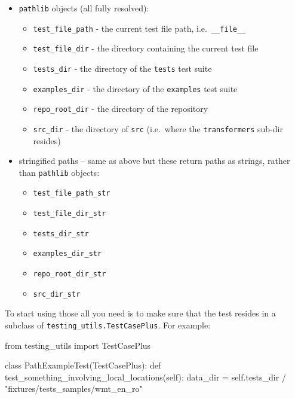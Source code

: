 \documentclass[
]{report}
\newenvironment{Shaded}{\begin{snugshade}}{\end{snugshade}}
\newcommand{\ImportTok}[1]{\textcolor[rgb]{0.00,0.46,0.62}{#1}}
\newcommand{\KeywordTok}[1]{\textcolor[rgb]{0.00,0.23,0.31}{#1}}
\newcommand{\NormalTok}[1]{\textcolor[rgb]{0.00,0.23,0.31}{#1}}
\newcommand{\OperatorTok}[1]{\textcolor[rgb]{0.37,0.37,0.37}{#1}}
\newcommand{\StringTok}[1]{\textcolor[rgb]{0.13,0.47,0.30}{#1}}
\newcommand{\VariableTok}[1]{\textcolor[rgb]{0.07,0.07,0.07}{#1}}
\providecommand{\tightlist}{%
  \setlength{\itemsep}{0pt}\setlength{\parskip}{0pt}}\usepackage{longtable,booktabs,array}
\begin{document}
\begin{itemize}
\item
  \texttt{pathlib} objects (all fully resolved):

  \begin{itemize}
  \tightlist
  \item
    \texttt{test\_file\_path} - the current test file path,
    i.e.~\texttt{\_\_file\_\_}
  \item
    \texttt{test\_file\_dir} - the directory containing the current test
    file
  \item
    \texttt{tests\_dir} - the directory of the \texttt{tests} test suite
  \item
    \texttt{examples\_dir} - the directory of the \texttt{examples} test
    suite
  \item
    \texttt{repo\_root\_dir} - the directory of the repository
  \item
    \texttt{src\_dir} - the directory of \texttt{src} (i.e.~where the
    \texttt{transformers} sub-dir resides)
  \end{itemize}
\item
  stringified paths -- same as above but these return paths as strings,
  rather than \texttt{pathlib} objects:

  \begin{itemize}
  \tightlist
  \item
    \texttt{test\_file\_path\_str}
  \item
    \texttt{test\_file\_dir\_str}
  \item
    \texttt{tests\_dir\_str}
  \item
    \texttt{examples\_dir\_str}
  \item
    \texttt{repo\_root\_dir\_str}
  \item
    \texttt{src\_dir\_str}
  \end{itemize}
\end{itemize}

To start using those all you need is to make sure that the test resides
in a subclass of \texttt{testing\_utils.TestCasePlus}. For example:

\begin{Shaded}
\begin{Highlighting}[]
\ImportTok{from}\NormalTok{ testing\_utils }\ImportTok{import}\NormalTok{ TestCasePlus}


\KeywordTok{class}\NormalTok{ PathExampleTest(TestCasePlus):}
    \KeywordTok{def}\NormalTok{ test\_something\_involving\_local\_locations(}\VariableTok{self}\NormalTok{):}
\NormalTok{        data\_dir }\OperatorTok{=} \VariableTok{self}\NormalTok{.tests\_dir }\OperatorTok{/} \StringTok{"fixtures/tests\_samples/wmt\_en\_ro"}
\end{Highlighting}
\end{Shaded}
\end{document}
